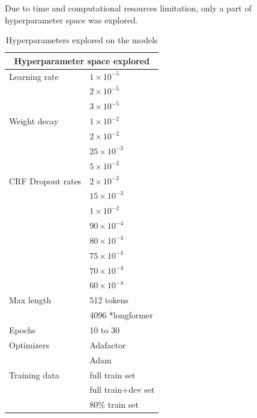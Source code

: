 \documentclass[11pt]{article}
\begin{document}
Due to time and computational resources limitation, only a part of hyperparameter space was explored.

\begin{table}[!ht]
\centering
\begin{tabular}{|l|l|}
\hline
\multicolumn{2}{|c|}{Hyperparameter space explored} \\
\hline
\hspace{2ex}Learning rate & $1 \times 10^{-5}$ \\
& $2 \times 10^{-5}$ \\
& $3 \times 10^{-5}$ \\
\hline
\hspace{2ex}Weight decay & $1 \times 10^{-2}$ \\
& $2 \times 10^{-2}$ \\
& $25 \times 10^{-3}$ \\
& $5 \times 10^{-2}$ \\
\hline
\hspace{2ex}CRF Dropout rates & $2 \times 10^{-2}$\\
& $15 \times 10^{-3}$\\
& $1 \times 10^{-2}$ \\
& $90 \times 10^{-4}$\\
& $80 \times 10^{-4}$\\
& $75 \times 10^{-4}$\\
& $70 \times 10^{-4}$\\
& $60 \times 10^{-4}$\\
\hline 
\hspace{2ex}Max length & 512 tokens \\
& 4096 *longformer \\
\hline
\hspace{2ex}Epochs & 10 to 30 \\
\hline
\hspace{2ex}Optimizers &  Adafactor \\
& Adam \\
\hline
\hspace{2ex}Training data & full train set \\
& full train+dev set \\
& 80\% train set \\
\hline
\end{tabular}
\caption{Hyperparameters explored on the models}
\label{table:9}
\end{table}
\end{document}
